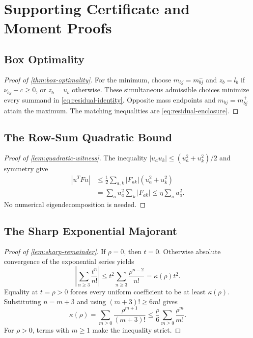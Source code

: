 \FloatBarrier
\section{Supporting Certificate and Moment Proofs}
\label{sec:theory-proofs}

\FloatBarrier
\subsection{Box Optimality}
\label{app:box-optimality}
\begin{proof}[Proof of \cref{thm:box-optimality}]
For the minimum, choose $m_{bj}=m^-_{bj}$ and $z_b=l_b$ if
$\nu_{bj}-c\ge0$, or $z_b=u_b$ otherwise. These simultaneous admissible
choices minimize every summand in \cref{eq:residual-identity}. Opposite mass
endpoints and $m_{bj}=m^+_{bj}$ attain the maximum. The matching inequalities
are \cref{eq:residual-enclosure}.
\end{proof}

\FloatBarrier
\subsection{The Row-Sum Quadratic Bound}
\label{app:quadratic-witness}
\begin{proof}[Proof of \cref{lem:quadratic-witness}]
The inequality $|u_a u_k|\le(u_a^2+u_k^2)/2$ and symmetry give
\begin{equation*}
 \begin{aligned}
 |u^TFu|&\le\frac12\sum_{a,k}|F_{ak}|(u_a^2+u_k^2)\\
 &=\sum_a u_a^2\sum_k|F_{ak}|\le\eta\sum_a u_a^2.
 \end{aligned}
\end{equation*}
No numerical eigendecomposition is needed.
\end{proof}

\FloatBarrier
\subsection{The Sharp Exponential Majorant}
\label{app:sharp-remainder}
\begin{proof}[Proof of \cref{lem:sharp-remainder}]
If $\rho=0$, then $t=0$. Otherwise absolute convergence of the exponential
series yields
\begin{equation*}
 \left|\sum_{n\ge3}\frac{t^n}{n!}\right|
 \le t^2\sum_{n\ge3}\frac{\rho^{n-2}}{n!}
 =\kappa(\rho)t^2.
\end{equation*}
Equality at $t=\rho>0$ forces every uniform coefficient to be at least
$\kappa(\rho)$. Substituting $n=m+3$ and using $(m+3)!\ge6m!$ gives
\begin{equation*}
 \kappa(\rho)=\sum_{m\ge0}\frac{\rho^{m+1}}{(m+3)!}
 \le\frac{\rho}{6}\sum_{m\ge0}\frac{\rho^m}{m!}.
\end{equation*}
For $\rho>0$, terms with $m\ge1$ make the inequality strict.
\end{proof}

